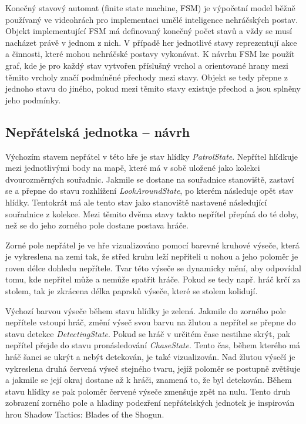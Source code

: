 \documentclass[FM,Proj]{tulthesis}
\begin{document}
	Konečný stavový automat (finite state machine, FSM) je výpočetní model běžně používaný ve videohrách pro implementaci umělé inteligence nehráčských postav. Objekt implementující FSM má definovaný konečný počet stavů a vždy se musí nacházet právě v jednom z nich. V případě her jednotlivé stavy reprezentují akce a činnosti, které mohou nehráčské postavy vykonávat. K návrhu FSM lze použít graf, kde je pro každý stav vytvořen příslušný vrchol a orientované hrany mezi těmito vrcholy značí podmíněné přechody mezi stavy. Objekt se tedy přepne z jednoho stavu do jiného, pokud mezi těmito stavy existuje přechod a jsou splněny jeho podmínky.
	\cite{lit1}
	
	\subsection{Nepřátelská jednotka – návrh}
	
	Výchozím stavem nepřátel v této hře je stav hlídky \textit{PatrolState}. Nepřítel hlídkuje mezi jednotlivými body na mapě, které má v sobě uložené jako kolekci dvourozměrných souřadnic. Jakmile se dostane na souřadnice stanoviště, zastaví se a přepne do stavu rozhlížení \textit{LookAroundState}, po kterém následuje opět stav hlídky. Tentokrát má ale tento stav jako stanoviště nastavené následující souřadnice z kolekce. Mezi těmito dvěma stavy takto nepřítel přepíná do té doby, než se do jeho zorného pole dostane postava hráče.
	
	Zorné pole nepřátel je ve hře vizualizováno pomocí barevné kruhové výseče, která je vykreslena na zemi tak, že střed kruhu leží nepříteli u nohou a jeho poloměr je roven délce dohledu nepřítele. Tvar této výseče se dynamicky mění, aby odpovídal tomu, kde nepřítel může a nemůže spatřit hráče. Pokud se tedy např. hráč krčí za stolem, tak je zkrácena délka paprsků výseče, které se stolem kolidují.
	
	Výchozí barvou výseče během stavu hlídky je zelená. Jakmile do zorného pole nepřítele vstoupí hráč, změní výseč svou barvu na žlutou a nepřítel se přepne do stavu detekce \textit{DetectingState}. Pokud se hráč v určitém čase nestihne skrýt, pak nepřítel přejde do stavu pronásledování \textit{ChaseState}. Tento čas, během kterého má hráč šanci se ukrýt a nebýt detekován, je také vizualizován. Nad žlutou výsečí je vykreslena druhá červená výseč stejného tvaru, jejíž poloměr se postupně zvětšuje a jakmile se její okraj dostane až k hráči, znamená to, že byl detekován. Během stavu hlídky se pak poloměr červené výseče zmenšuje zpět na nulu. Tento druh zobrazení zorného pole a hladiny podezření nepřátelských jednotek je inspirován hrou Shadow Tactics: Blades of the Shogun.
	
\end{document}
